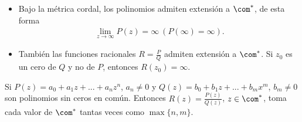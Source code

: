 \begin{obs}
\begin{itemize}
    \item Bajo la métrica cordal, los polinomios admiten extensión a $\com^*$, de esta forma
    \begin{align*}
        \lim_{z \to \infty}{P(z) = \infty} \ (P(\infty) = \infty).
    \end{align*}
    \item También las funciones racionales $R = \frac{P}{Q}$ admiten extensión a $\com^*$. Si $z_0$ es un cero de $Q$ y no de $P$, entonces $R(z_0) = \infty$.
\end{itemize}
\end{obs}

\begin{prop}
Si $P(z) = a_0 + a_1z + ... + a_nz^n$, $a_n \not = 0$ y $Q(z) = b_0 + b_1z + ... + b_mx^m$, $b_m \not = 0$ son polinomios sin ceros en común. Entonces $R(z) = \frac{P(z)}{Q(z)}$, $z \in \com^*$, toma cada valor de $\com^*$ tantas veces como $\max\{n,m\}$.
\end{prop}

